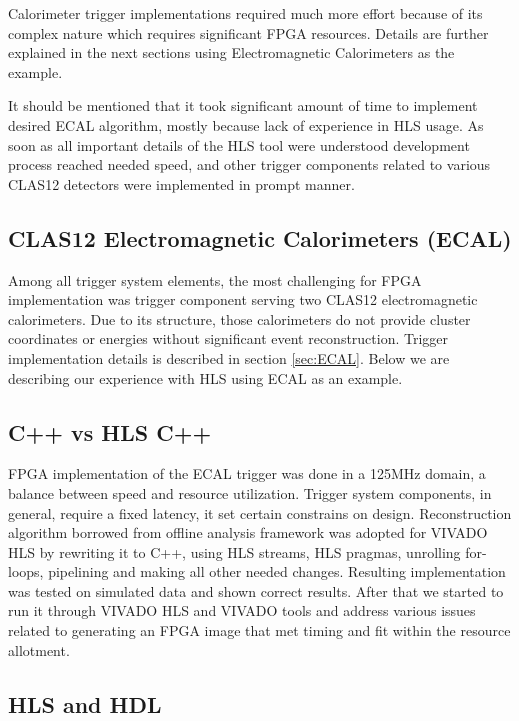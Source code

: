 Calorimeter trigger implementations required much more effort because of its complex nature which requires significant FPGA resources. Details are further explained in the next sections using Electromagnetic Calorimeters as the example.

It should be mentioned that it took significant amount of time to implement desired ECAL algorithm, mostly because lack of experience in HLS usage. As soon as all important details of the HLS tool were understood development process reached needed speed, and other trigger components related to various CLAS12 detectors were implemented in prompt manner.


\subsection{CLAS12 Electromagnetic Calorimeters (ECAL)}

Among all trigger system elements, the most challenging for FPGA implementation was trigger component serving two CLAS12 electromagnetic calorimeters. Due to its structure, those calorimeters do not provide cluster coordinates or energies without significant event reconstruction. Trigger implementation details is described in section \ref{sec:ECAL}. Below we are describing our experience with HLS using ECAL as an example.


\subsection{C++ vs HLS C++}

FPGA implementation of the ECAL trigger was done in a 125MHz domain, a balance between speed and resource utilization. Trigger system components, in general, require a fixed latency, it set certain constrains on design. Reconstruction algorithm borrowed from offline analysis framework was adopted for VIVADO HLS by rewriting it to C++, using HLS streams, HLS pragmas, unrolling for-loops, pipelining and making all other needed changes. Resulting implementation was tested on simulated data and shown correct results. After that we started to run it through VIVADO HLS and VIVADO tools and address various issues related to generating an FPGA image that met timing and fit within the resource allotment.


\subsection{HLS and HDL}

